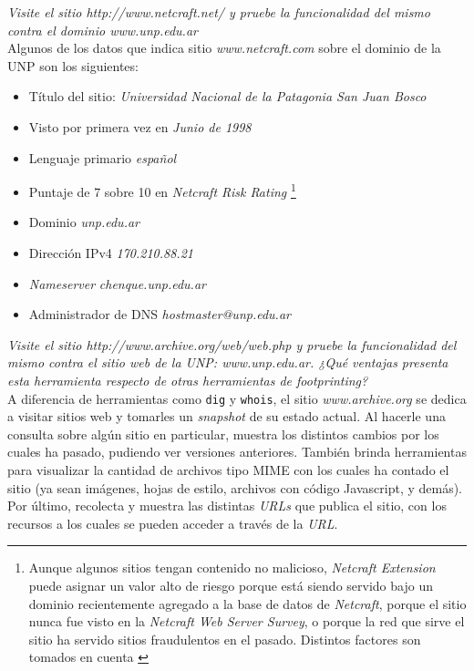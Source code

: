 \emph{Visite el sitio http://www.netcraft.net/ y pruebe la funcionalidad del mismo contra el dominio www.unp.edu.ar} 
~\\

Algunos de los datos que indica sitio \emph{www.netcraft.com} sobre el dominio de la UNP son los siguientes:

\begin{itemize}
    \item Título del sitio: \emph{Universidad Nacional de la Patagonia San Juan Bosco} 
    \item Visto por primera vez en \emph{Junio de 1998} 
    \item Lenguaje primario \emph{español} 
    \item Puntaje de 7 sobre 10 en \emph{Netcraft Risk Rating} \footnote{Aunque algunos sitios tengan contenido no malicioso, \emph{Netcraft Extension} puede asignar un valor alto de riesgo porque está siendo servido bajo un dominio recientemente agregado a la base de datos de \emph{Netcraft}, porque el sitio nunca fue visto en la \emph{Netcraft Web Server Survey}, o porque la red que sirve el sitio ha servido sitios fraudulentos en el pasado. Distintos factores son tomados en cuenta \autocite{NetcraftRiskRatingFAQ}} 
    \item Dominio \emph{unp.edu.ar} 
    \item Dirección IPv4 \emph{170.210.88.21} 
    \item \emph{Nameserver} \emph{chenque.unp.edu.ar}  
    \item Administrador de DNS \emph{hostmaster@unp.edu.ar} 
\end{itemize}

\emph{Visite el sitio http://www.archive.org/web/web.php y pruebe la funcionalidad del mismo contra el sitio web de la UNP: www.unp.edu.ar. ¿Qué ventajas presenta esta herramienta respecto de otras herramientas de footprinting?} 
~\\

A diferencia de herramientas como \texttt{dig} y \texttt{whois}, el sitio \emph{www.archive.org} se dedica a visitar sitios web y tomarles un \emph{snapshot} de su estado actual. Al hacerle una consulta sobre algún sitio en particular, muestra los distintos cambios por los cuales ha pasado, pudiendo ver versiones anteriores. También brinda herramientas para visualizar la cantidad de archivos tipo MIME con los cuales ha contado el sitio (ya sean imágenes, hojas de estilo, archivos con código Javascript, y demás). Por último, recolecta y muestra las distintas \emph{URLs} que publica el sitio, con los recursos a los cuales se pueden acceder a través de la \emph{URL}.

